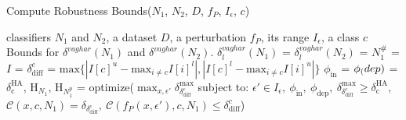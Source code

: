 \documentclass[11pt]{article}
\begin{document}
\begin{algorithm}
\caption{Compute Robustness Bounds($N_1$, $N_2$, $D$, $f_P$, $I_\epsilon$, $c$)}
\begin{algorithmic}[1]
 classifiers $N_1$ and $N_2$, a dataset $D$, a perturbation $f_P$, its range $I_\epsilon$, a class $c$
\Ensure Bounds for $\delta^{vaghar}(N_1)$ and $\delta^{vaghar}(N_2)$.
\State $\delta^{vaghar}_{l}(N_1)$ = 
\State $\delta^{vaghar}_{l}(N_2)$ = 
\State $N_1^\#$ = 
\State $I$ = 
\State $\delta_\text{diff}^c$ = $\text{max}\{ |I[c]^u-\text{max}_{i\ne{c}}{I[i]^l}|,|I[c]^l-\text{max}_{i\ne{c}}{I[i]^u}| \}$
\State $\phi_\text{in}$ = 
\State $\phi_\text(dep)$ = 
\State $\delta^\text{HA}_\text{c}$, $\text{H}_{N_1}$, $\text{H}_{N_1^p}$ = 
\State optimize($\max_{x,\epsilon'}\delta_{\delta_\text{diff}^c}^\text{max}$ subject to: 
$\epsilon'\in I_\epsilon,\ \phi_\text{in},\ \phi_\text{dep},\ \delta_{\delta_\text{diff}^c}^\text{max} \geq \delta^\text{HA}_\text{c},$\\
\hspace*{2em} $\mathcal{C}(x,c,N_1)=\delta_{\delta_\text{diff}^c},\ 
\mathcal{C}(f_P(x,\epsilon'),c,N_1) \leq \delta_\text{diff}^c$)

\State \Return {}
\end{algorithmic}
\end{algorithm}
 
\end{document}
